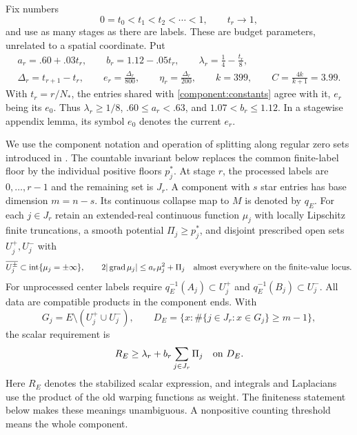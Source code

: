 Fix numbers
\[
 0=t_0<t_1<t_2<\cdots<1,\qquad t_r\longrightarrow1,
\]
and use as many stages as there are labels. These are budget parameters,
unrelated to a spatial coordinate. Put
\begin{equation}\label{countable:constants}
 \begin{gathered}
 a_r=.60+.03t_r,\qquad b_r=1.12-.05t_r,
 \qquad \lambda_r=\frac14-\frac{t_r}{8},\\
 \Delta_r=t_{r+1}-t_r,\qquad
 e_r=\frac{\Delta_r}{800},\qquad
 \eta_r=\frac{\Delta_r}{200},\qquad k=399,
 \qquad C=\frac{4k}{k+1}=3.99.
 \end{gathered}
\end{equation}
With $t_r=r/N_*$, the entries shared with \eqref{component:constants}
agree with it, $e_r$ being its $e_0$.
Thus $\lambda_r\ge1/8$, $.60\le a_r<.63$, and
$1.07<b_r\le1.12$. In a stagewise
appendix lemma, its symbol $e_0$ denotes the current $e_r$.

We use the component notation and operation of splitting along regular zero sets introduced in
. The countable invariant below replaces the common
finite-label floor by the individual positive floors $p_j^*$.
At stage $r$, the processed labels are $0,\ldots,r-1$ and the remaining
set is $J_r$. A component with $s$ star entries has base dimension $m=n-s$.
Its continuous collapse map to $M$ is denoted by $q_E$. For each
$j\in J_r$ retain an extended-real continuous function $\mu_j$ with
locally Lipschitz finite truncations, a smooth potential
$\Pi_j\ge p_j^*$, and disjoint prescribed open sets $U_j^+,U_j^-$ with
\begin{equation}\label{countable:function-invariant}
 \overline{U_j^\pm}\subset\operatorname{int}\{\mu_j=\pm\infty\},
 \qquad 2|\operatorname{grad}\mu_j|\le a_r\mu_j^2+\Pi_j
 \quad\hbox{almost everywhere on the finite-value locus}.
\end{equation}
For unprocessed center labels require
$q_E^{-1}(A_j)\subset U_j^+$ and $q_E^{-1}(B_j)\subset U_j^-$.
All data are compatible products in the component ends. With
\begin{equation}\label{countable:required}
 G_j=E\setminus(U_j^+\cup U_j^-),\qquad
 D_E=\{x:\#\{j\in J_r:x\in G_j\}\ge m-1\},
\end{equation}
the scalar requirement is
\begin{equation}\label{countable:scalar-invariant}
 R_E\ge\lambda_r+b_r\sum_{j\in J_r}\Pi_j\quad\hbox{on }D_E.
\end{equation}
Here $R_E$ denotes the stabilized scalar expression, and integrals and
Laplacians use the product of the old warping functions as weight. The
finiteness statement below makes these meanings unambiguous. A nonpositive
counting threshold means the whole component.

